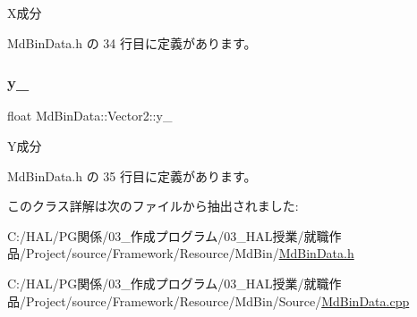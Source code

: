 X成分 



 Md\+Bin\+Data.\+h の 34 行目に定義があります。

\mbox{\label{class_md_bin_data_1_1_vector2_afdd7301e3bb185356463203385c30e1f}} 
\subsubsection{\texorpdfstring{y\+\_\+}{y\_}}
{\footnotesize\ttfamily float Md\+Bin\+Data\+::\+Vector2\+::y\+\_\+\hspace{0.3cm}{\ttfamily [private]}}



Y成分 



 Md\+Bin\+Data.\+h の 35 行目に定義があります。



このクラス詳解は次のファイルから抽出されました\+:\begin{DoxyCompactItemize}
\item 
C\+:/\+H\+A\+L/\+P\+G関係/03\+\_\+作成プログラム/03\+\_\+\+H\+A\+L授業/就職作品/\+Project/source/\+Framework/\+Resource/\+Md\+Bin/\mbox{\hyperlink{_md_bin_data_8h}{Md\+Bin\+Data.\+h}}\item 
C\+:/\+H\+A\+L/\+P\+G関係/03\+\_\+作成プログラム/03\+\_\+\+H\+A\+L授業/就職作品/\+Project/source/\+Framework/\+Resource/\+Md\+Bin/\+Source/\mbox{\hyperlink{_md_bin_data_8cpp}{Md\+Bin\+Data.\+cpp}}\end{DoxyCompactItemize}
